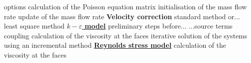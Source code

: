\begin{table}[htp]
options\newline
\hspace*{2,5cm} \hspace*{1cm}calculation of the Poisson
equation matrix\newline
\hspace*{2,5cm} \hspace*{1cm}initialisation of the mass flow
rate\newline
\hspace*{2,5cm} \hspace*{1cm}update of the mass flow rate%
\newline
\hspace*{1,5cm} \textbf{Velocity correction}\newline
\hspace*{3,2cm} \hspace*{1cm}standard method or...\newline
\hspace*{2,0cm} \hspace*{1cm}least square method\newline
\underline{\textbf{$k-\varepsilon$ model}}\newline
\hspace*{1cm}\newline
\hspace*{1,5cm} \hspace*{1cm}preliminary steps before...\newline
\hspace*{1,5cm} \hspace*{1,5cm}...source terms coupling\newline
\hspace*{1,5cm} \hspace*{1cm}calculation of the viscosity at
the faces\newline
\hspace*{1,5cm} \hspace*{1cm}iterative solution of the systems
using an incremental method\newline
\underline{\textbf{Reynolds stress model}}\newline
\hspace*{1cm}\newline
\hspace*{1,5cm} \hspace*{1cm}calculation of the viscosity at
the faces\newline

\end{table}
